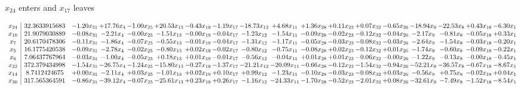 \documentclass[9pt]{article}
\begin{document}
 $ x_{24} $ enters and $ x_{17} $ leaves 

 \[\begin{array}{c| c c@{\hskip 2pt} c@{\hskip 2pt} c@{\hskip 2pt} c@{\hskip 2pt} c@{\hskip 2pt} c@{\hskip 2pt} c@{\hskip 2pt} c@{\hskip 2pt} c@{\hskip 2pt} c@{\hskip 2pt} c@{\hskip 2pt} c@{\hskip 2pt} c@{\hskip 2pt} c@{\hskip 2pt} c@{\hskip 2pt} c@{\hskip 2pt} }
 x_{24}   &  32.3633915683 & -1.20 x_{31} & + 17.76 x_{4} & -1.00 x_{25} & + 20.53 x_{13} & -0.43 x_{19} & -1.19 x_{17} & -18.73 x_{12} & +  4.68 x_{11} & +  1.36 x_{28} & +  0.11 x_{23} & +  0.07 x_{32} & -0.65 x_{26} & -18.94 x_{9} & -22.53 x_{8} & +  0.43 x_{18} & -6.30 x_{1}\\
 x_{10}   &  21.9079030889 & -0.08 x_{31} & -2.21 x_{4} & -0.00 x_{25} & -1.51 x_{13} & -0.00 x_{19} & -0.04 x_{17} & -1.23 x_{12} & -1.54 x_{11} & -0.09 x_{28} & -0.02 x_{23} & -0.12 x_{32} & -0.04 x_{26} & -2.17 x_{9} & -0.81 x_{8} & -0.05 x_{18} & +  0.33 x_{1}\\
 x_{7}   &  20.6170478306 & -0.11 x_{31} & -1.86 x_{4} & -0.07 x_{25} & -0.55 x_{13} & -0.01 x_{19} & -0.04 x_{17} & -1.31 x_{12} & -1.17 x_{11} & -0.05 x_{28} & -0.03 x_{23} & -0.08 x_{32} & -0.03 x_{26} & -2.64 x_{9} & -1.54 x_{8} & -0.03 x_{18} & -0.20 x_{1}\\
 x_{5}   &  16.1775420538 & -0.09 x_{31} & -2.78 x_{4} & -0.02 x_{25} & -0.80 x_{13} & +  0.02 x_{19} & -0.02 x_{17} & -0.80 x_{12} & -0.75 x_{11} & -0.08 x_{28} & +  0.02 x_{23} & -0.12 x_{32} & +  0.01 x_{26} & -1.74 x_{9} & -0.60 x_{8} & -0.09 x_{18} & -0.22 x_{1}\\
 x_{6}   &  7.06437767964 & -0.03 x_{31} & -1.00 x_{4} & -0.05 x_{25} & +  0.18 x_{13} & +  0.01 x_{19} & -0.01 x_{17} & -0.56 x_{12} & -0.04 x_{11} & +  0.01 x_{28} & +  0.01 x_{23} & -0.06 x_{32} & -0.00 x_{26} & -1.22 x_{9} & -0.13 x_{8} & -0.00 x_{18} & -0.45 x_{1}\\
 x_{22}   &  372.379434998 & -1.54 x_{31} & -26.75 x_{4} & -1.24 x_{25} & -15.80 x_{13} & -0.27 x_{19} & -1.37 x_{17} & -21.21 x_{12} & -20.09 x_{11} & -0.66 x_{28} & -0.12 x_{23} & -1.54 x_{32} & -0.94 x_{26} & -52.21 x_{9} & -36.57 x_{8} & -0.67 x_{18} & -8.67 x_{1}\\
 x_{14}   &  8.7412424675 & +  0.00 x_{31} & -2.11 x_{4} & +  0.03 x_{25} & -1.01 x_{13} & +  0.02 x_{19} & +  0.10 x_{17} & +  0.99 x_{12} & -1.23 x_{11} & -0.10 x_{28} & -0.03 x_{23} & -0.08 x_{32} & +  0.03 x_{26} & -0.56 x_{9} & +  0.75 x_{8} & -0.02 x_{18} & +  0.04 x_{1}\\
 x_{30}   &  317.565364591 & -0.86 x_{31} & -39.12 x_{4} & -0.07 x_{25} & -25.61 x_{13} & +  0.23 x_{19} & +  0.26 x_{17} & -1.16 x_{12} & -24.33 x_{11} & -1.70 x_{28} & -0.52 x_{23} & -2.01 x_{32} & +  0.08 x_{26} & -32.61 x_{9} & -7.49 x_{8} & -1.52 x_{18} & -8.54 x_{1}\\

\end{array}\]
\end{document}
